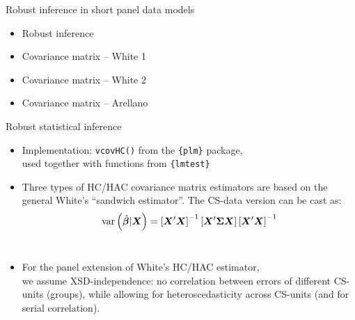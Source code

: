 \documentclass[usenames,dvipsnames]{beamer}
\begin{document}
\begin{frame}{Robust inference in short panel data models}
\begin{itemize}
    \item Robust inference
    \bigskip
    \item Covariance matrix -- White 1 
    \bigskip
    \item Covariance matrix -- White 2
    \bigskip
    \item Covariance matrix -- Arellano
\end{itemize}
\end{frame}
\begin{frame}{Robust statistical inference}
\begin{itemize}
    \item Implementation: \texttt{vcovHC()} from the \texttt{\{plm\}} package, 
    \\used together with functions from \texttt{\{lmtest\}}
    \medskip
    \item Three types of HC/HAC covariance matrix estimators are based on the general White's ``sandwich estimator''. The CS-data version can be cast as:\\
    \medskip
    $$\textnormal{var} \left(\hat{\bm{\beta}}|\bm{X}\right)= 
    \left[ \bm{X}^{\prime} \bm{X} \right]^{-1}
    \left[ \bm{X}^{\prime} \bm{\Sigma} \bm{X} \right]
    \left[ \bm{X}^{\prime} \bm{X} \right]^{-1}$$ \\ \medskip
     \medskip
    \item For the panel extension of White's HC/HAC estimator, \\we assume XSD-independence: no correlation between errors of different CS-units (groups), while allowing for heteroscedasticity across CS-units (and for serial correlation).
\end{itemize}
\end{frame}
\end{document}
